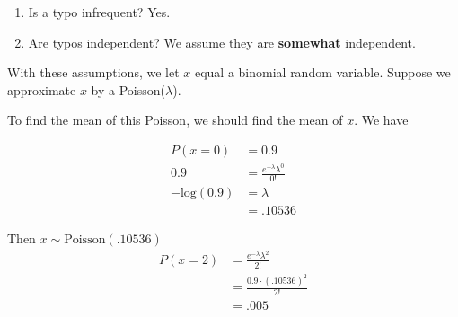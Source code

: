 \documentclass[letterpaper,12pt]{article}
\begin{document}
\begin{enumerate}
    \item Is a typo infrequent? Yes.
    \item Are typos independent? We assume they are \textbf{somewhat} independent.
\end{enumerate}


With these assumptions, we let $x$ equal a binomial random variable. Suppose we approximate $x$ by a 
Poisson($\lambda$).


To find the mean of this Poisson, we should find the mean of $x$. We have

\begin{align*}
    P(x = 0) &= 0.9\\
    0.9 &= \frac{e^{-\lambda}\lambda^0}{0!}\\
    -\mathrm{log}(0.9)    &= \lambda\\
                          &= .10536
\end{align*}

Then $x \sim \mathrm{Poisson}(.10536)$
\begin{align*}
    P(x = 2) &= \frac{e^{-\lambda}\lambda^2}{2!}\\
             &= \frac{0.9 \cdot (.10536)^2}{2!}\\
             &= .005
\end{align*}
\end{document}
